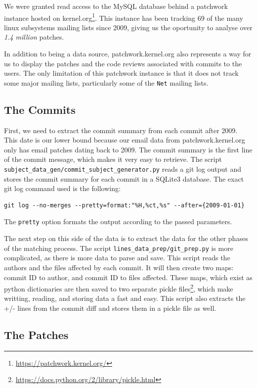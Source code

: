 We were granted read access to the MySQL database behind a patchwork instance hosted on kernel.org\footnote{\url{https://patchwork.kernel.org/}}. This instance has been tracking 69 of the many linux subsystems mailing lists since 2009, giving us the oportunity to analyse over \textit{1.4 million} patches.

In addition to being a data source, patchwork.kernel.org also represents a way for us to display the patches and the code reviews associated with commits to the users. The only limitation of this patchwork instance is that it does not track some major mailing lists, particularly some of the \texttt{Net} mailing lists.


\subsection{The Commits}

First, we need to extract the commit summary from each commit after 2009. This date is our lower bound because our email data from patchwork.kernel.org only has email patches dating back to 2009. The commit summary is the first line of the commit message, which makes it very easy to retrieve. The script \texttt{subject\_data\_gen/commit\_subject\_generator.py} reads a git log output and stores the commit summary for each commit in a SQLite3 database. The exact git log command used is the following:
\begin{lstlisting}
git log --no-merges --pretty=format:"%H,%ct,%s" --after={2009-01-01}
\end{lstlisting}
The \texttt{pretty} option formats the output according to the passed parameters. 

The next step on this side of the data is to extract the data for the other phases of the matching process. The script \texttt{lines\_data\_prep/git\_prep.py} is more complicated, as there is more data to parse and save. This script reads the authors and the files affected by each commit. It will then create two maps: commit ID to author, and commit ID to files affected. These maps, which exist as python dictionaries are then saved to two separate pickle files\footnote{\url{https://docs.python.org/2/library/pickle.html}}, which make writting, reading, and storing data a fast and easy. This script also extracts the +/- lines from the commit diff and stores them in a pickle file as well. 



\subsection{The Patches}

